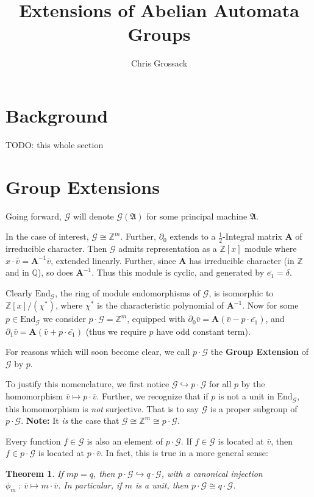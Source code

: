 \documentclass[12pt]{article}
\title{Extensions of Abelian Automata Groups}
\author{Chris Grossack}
\newcommand{\G}{\mathcal{G}}
\renewcommand{\P}{\mathfrak{A}}
\newcommand{\Z}{\mathbb{Z}}
\newcommand{\Q}{\mathbb{Q}}
\newcommand{\2}{\textbf{2}}
\newcommand{\Am}{\textbf{A}}
\newcommand{\del}{\partial}
\renewcommand{\v}{\bar{v}}
\newtheorem{thm}{Theorem}
\begin{document}
\maketitle

\section{Background}
TODO: this whole section

\section{Group Extensions}
Going forward, $\G$ will denote $\G(\P)$ for some principal machine $\P$.

In the case of interest, $\G \cong \Z^m$. Further, $\del_0$ extends to 
a $\frac{1}{2}$-Integral matrix $\Am$ of irreducible character. Then
$\G$ admits representation as a $\Z[x]$ module where 
$x \cdot \v = \Am^{-1}\v$, extended linearly.
Further, since $\Am$ has irreducible character (in $\Z$ and in $\Q$), 
so does $\Am^{-1}$. Thus this module is cyclic, 
and generated by $\bar{e_1} = \delta$.

Clearly $\text{End}_{\G}$, the ring of module endomorphisms of $\G$, 
is isomorphic to $\Z[x]/(\chi^*)$, 
where $\chi^*$ is the characteristic polynomial of $\Am^{-1}$.
Now for some $p \in \text{End}_{\G}$ we consider
$p \cdot \G = \Z^m$, equipped with
$\del_0 \v = \Am (\v - p \cdot \bar{e_1})$, and 
$\del_1 \v = \Am (\v + p \cdot \bar{e_1})$
(thus we require $p$ have odd constant term).

For reasons which will soon become clear, we call $p \cdot \G$ the
\textbf{Group Extension} of $\G$ by $p$.

To justify this nomenclature, we first notice 
$\G \hookrightarrow p \cdot \G$ for all $p$ by the
homomorphism $\v \mapsto p \cdot \v$. 
Further, we recognize that if $p$ is not a unit in $\text{End}_{\G}$, 
this homomorphism is \emph{not} surjective. 
That is to say $\G$ is a proper subgroup of $p \cdot \G$.
\textbf{Note:} It \emph{is} the case that $\G \cong \Z^m \cong p \cdot \G$. 

Every function $f \in \G$ is also an element of $p \cdot \G$. 
If $f \in \G$ is located at $\v$, then $f \in p \cdot \G$ is located
at $p \cdot \v$. In fact, this is true in a more general sense:

\begin{thm}
  If $mp = q$, then $p \cdot \G \hookrightarrow q \cdot \G$, 
  with a canonical injection $\phi_m~:~\v \mapsto m \cdot \v$. 
  In particular, if $m$ is a unit, then $p \cdot \G \cong q \cdot \G$.
\end{thm}
\end{document}
